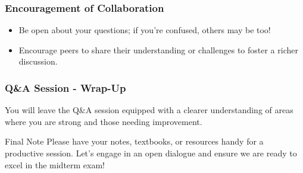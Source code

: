 \documentclass[aspectratio=169]{beamer}
\begin{document}
\begin{frame}[fragile]
    \frametitle{Encouragement of Collaboration}
    \begin{itemize}
        \item Be open about your questions; if you're confused, others may be too!
        \item Encourage peers to share their understanding or challenges to foster a richer discussion.
    \end{itemize}
\end{frame}

\begin{frame}[fragile]
    \frametitle{Q\&A Session - Wrap-Up}
    You will leave the Q\&A session equipped with a clearer understanding of areas where you are strong and those needing improvement.
    
    \begin{block}{Final Note}
        Please have your notes, textbooks, or resources handy for a productive session. Let’s engage in an open dialogue and ensure we are ready to excel in the midterm exam!
    \end{block}
\end{frame}
\end{document}
